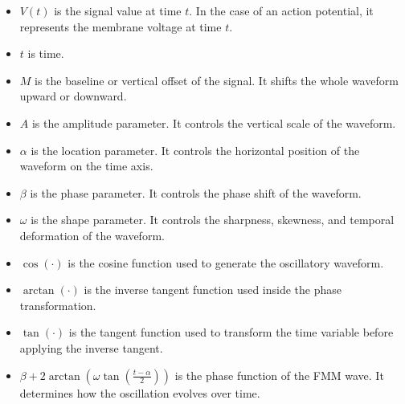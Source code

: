 \documentclass[a4paper]{article}
\begin{document}
        \begin{itemize}
            \item $V(t)$ is the signal value at time $t$. In the case of an action potential, it represents the membrane voltage at time $t$.
            
            \item $t$ is time.
            
            \item $M$ is the baseline or vertical offset of the signal. It shifts the whole waveform upward or downward.
            
            \item $A$ is the amplitude parameter. It controls the vertical scale of the waveform.
            
            \item $\alpha$ is the location parameter. It controls the horizontal position of the waveform on the time axis.
            
            \item $\beta$ is the phase parameter. It controls the phase shift of the waveform.
            
            \item $\omega$ is the shape parameter. It controls the sharpness, skewness, and temporal deformation of the waveform.
            
            \item $\cos(\cdot)$ is the cosine function used to generate the oscillatory waveform.
            
            \item $\arctan(\cdot)$ is the inverse tangent function used inside the phase transformation.
            
            \item $\tan(\cdot)$ is the tangent function used to transform the time variable before applying the inverse tangent.
            
            \item $\beta + 2 \arctan\left(\omega \tan\left(\frac{t-\alpha}{2}\right)\right)$ is the phase function of the FMM wave. It determines how the oscillation evolves over time.
        \end{itemize}
        
        
        
\end{document}
